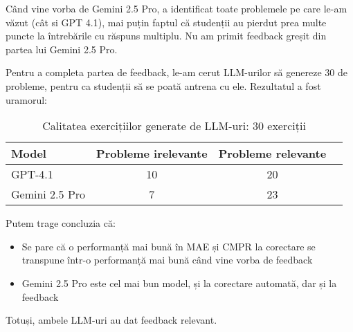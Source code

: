 \documentclass[12pt, a4paper]{report}
\begin{document}
Când vine vorba de Gemini 2.5 Pro, a identificat toate problemele pe care le-am văzut (cât si GPT 4.1), mai puțin faptul că studenții au pierdut prea multe puncte la întrebările cu răspuns multiplu.
Nu am primit feedback greșit din partea lui Gemini 2.5 Pro.

Pentru a completa partea de feedback,
le-am cerut LLM-urilor să genereze 30 de probleme,
pentru ca studenții să se poată antrena cu ele.
Rezultatul a fost uramorul:
\begin{table}[h!]
\centering
\begin{tabular}{|l|c|c|c|}
\hline
\textbf{Model}& \textbf{Probleme irelevante} & \textbf{Probleme relevante} \\
\hline
GPT-4.1  & 10 & 20 \\
Gemini 2.5 Pro & 7 & 23 \\
\hline
\end{tabular}
\caption{Calitatea exercițiilor generate de LLM-uri: 30 exerciții}
\label{tab:exercitii_llm}
\end{table}

Putem trage concluzia că:
\begin{itemize}
\item Se pare că o performanță mai bună în MAE și CMPR la corectare
se transpune într-o performanță mai bună când vine vorba de feedback
\item Gemini 2.5 Pro este cel mai bun model, și la corectare automată, dar și la feedback
\end{itemize}

Totuși, ambele LLM-uri au dat feedback relevant.

\endgroup


\printbibliography[heading=bibintoc]
\end{document}
